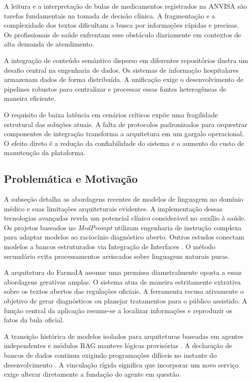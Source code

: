 \documentclass[12pt]{article}
\begin{document}
A leitura e a interpretação de bulas de medicamentos registrados na ANVISA são tarefas fundamentais na tomada de decisão clínica. A fragmentação e a complexidade dos textos dificultam a busca por informações rápidas e precisas. Os profissionais de saúde enfrentam esse obstáculo diariamente em contextos de alta demanda de atendimento.

A integração de conteúdo semântico disperso em diferentes repositórios ilustra um desafio central na engenharia de dados. Os sistemas de informação hospitalares armazenam dados de forma distribuída. A unificação exige o desenvolvimento de pipelines robustos para centralizar e processar essas fontes heterogêneas de maneira eficiente.

O requisito de baixa latência em cenários críticos expõe uma fragilidade estrutural das soluções atuais. A falta de protocolos padronizados para orquestrar componentes de integração transforma a arquitetura em um gargalo operacional. O efeito direto é a redução da confiabilidade do sistema e o aumento do custo de manutenção da plataforma.

\subsection{Problemática e Motivação}
\label{subsec:problematica}

A subseção detalha as abordagens recentes de modelos de linguagem no domínio médico e suas limitações arquiteturais evidentes. A implementação dessas tecnologias avançadas revela um potencial clínico considerável no auxílio à saúde. Os projetos baseados no \textit{MedPrompt} \cite{nori2023medprompt} utilizam engenharia de instrução complexa para adaptar modelos ao raciocínio diagnóstico aberto. Outros estudos conectam modelos a bancos estruturados via Integração de Interfaces \cite{wang2024drugbank}. O método secundário evita processamentos arriscados sobre linguagens naturais puras.

A arquitetura do FarmaIA assume uma premissa diametralmente oposta a essas abordagens gerativas amplas. O sistema atua de maneira estritamente extrativa sobre os textos abertos das regulações oficiais. A ferramenta recusa ativamente o objetivo de gerar diagnósticos ou planejar tratamentos para o público assistido. A função central da aplicação resume-se a localizar informações e reproduzir os fatos da bula oficial.

A transição histórica de modelos isolados para arquiteturas baseadas em agentes independentes e módulos RAG manteve lógicas provisórias \cite{lewis2020rag}. A declaração de bancos de dados continua exigindo programações difíceis no instante do desenvolvimento \cite{hou2025mcp}. A vinculação rígida significa que incorporar um novo serviço exige alterar diretamente a fundação do agente em questão.
\end{document}
